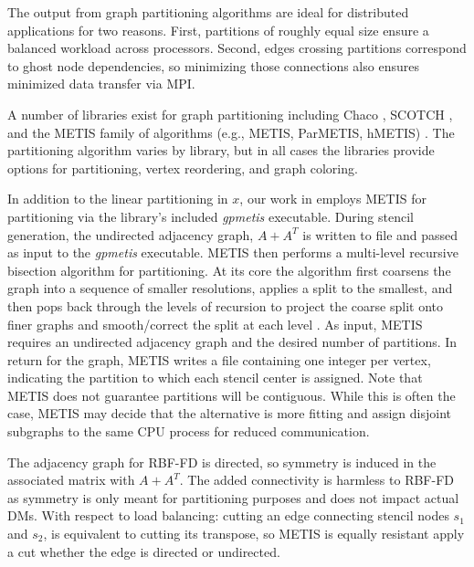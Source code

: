 \documentclass{report}
\begin{document}
The output from graph partitioning algorithms are ideal for distributed applications for two reasons. First, partitions of roughly equal size ensure a balanced workload across processors. Second, edges crossing partitions correspond to ghost node dependencies, so minimizing those connections also ensures minimized data transfer via MPI. 

A number of libraries exist for graph partitioning including Chaco \cite{CHACO1995}, SCOTCH \cite{SCOTCH1996}, and the METIS family of algorithms (e.g., METIS, ParMETIS, hMETIS) \cite{Karypis1999}. The partitioning algorithm varies by library, but in all cases the libraries provide options for partitioning, vertex reordering, and graph coloring.

In addition to the linear partitioning in $x$, our work in \cite{BolligRBFFDCode} employs METIS for partitioning via the library's included \emph{gpmetis} executable. During stencil generation, the undirected adjacency graph, $A+A^T$ is written to file and passed as input to the \emph{gpmetis} executable. METIS then performs a multi-level recursive bisection algorithm for partitioning. At its core the algorithm first coarsens the graph into a sequence of smaller resolutions, applies a split to the smallest, and then pops back through the levels of recursion to project the coarse split onto finer graphs and smooth/correct the split at each level \cite{Karypis1999}. As input, METIS requires an undirected adjacency graph and the desired number of partitions. 
In return for the graph, METIS writes a file containing one integer per vertex, indicating the partition to which each stencil center is assigned. Note that METIS does not guarantee partitions will be contiguous. While this is often the case, METIS may decide that the alternative is more fitting and assign disjoint subgraphs to the same CPU process for reduced communication. 

The adjacency graph for RBF-FD is directed, so symmetry is induced in the associated matrix with $A+A^T$. The added connectivity is harmless to RBF-FD as symmetry is only meant for partitioning purposes and does not impact actual DMs. With respect to load balancing: cutting an edge connecting stencil nodes $s_1$ and $s_2$, is equivalent to cutting its transpose, so METIS is equally resistant apply a cut whether the edge is directed or undirected. 
\end{document}
